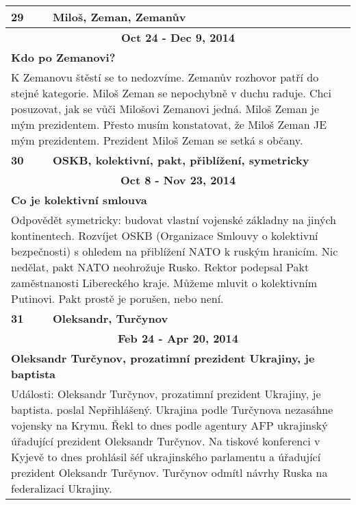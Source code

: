 \begin{tabularx}{\linewidth}{l l}
            \bf 29 & \bf Miloš, Zeman, Zemanův \\ \midrule
            
                \multicolumn{2}{c}{\bf Oct 24 - Dec 9, 2014} \\
                \multicolumn{2}{p{\linewidth}}{\bf Kdo po Zemanovi?} \\
                \multicolumn{2}{p{\linewidth}}{K Zemanovu štěstí se to nedozvíme. Zemanův rozhovor patří do stejné kategorie. Miloš Zeman se nepochybně v duchu raduje. Chci posuzovat, jak se vůči Milošovi Zemanovi jedná. Miloš Zeman je mým prezidentem. Přesto musím konstatovat, že Miloš Zeman JE mým prezidentem. Prezident Miloš Zeman se setká s občany.} \\ \midrule
                [1.5pt]

            \bf 30 & \bf OSKB, kolektivní, pakt, přiblížení, symetricky \\ \midrule
            
                \multicolumn{2}{c}{\bf Oct 8 - Nov 23, 2014} \\
                \multicolumn{2}{p{\linewidth}}{\bf Co je kolektivní smlouva} \\
                \multicolumn{2}{p{\linewidth}}{Odpovědět symetricky: budovat vlastní vojenské základny na jiných kontinentech. Rozvíjet OSKB (Organizace Smlouvy o kolektivní bezpečnosti) s ohledem na přiblížení NATO k ruským hranicím. Nic nedělat, pakt NATO neohrožuje Rusko. Rektor podepsal Pakt zaměstnanosti Libereckého kraje. Můžeme mluvit o kolektivním Putinovi. Pakt prostě je porušen, nebo není.} \\ \midrule
                [1.5pt]

            \bf 31 & \bf Oleksandr, Turčynov \\ \midrule
            
                \multicolumn{2}{c}{\bf Feb 24 - Apr 20, 2014} \\
                \multicolumn{2}{p{\linewidth}}{\bf Oleksandr Turčynov, prozatimní prezident Ukrajiny, je baptista} \\
                \multicolumn{2}{p{\linewidth}}{Události: Oleksandr Turčynov, prozatimní prezident Ukrajiny, je baptista. poslal Nepřihlášený. Ukrajina podle Turčynova nezasáhne vojensky na Krymu. Řekl to dnes podle agentury AFP ukrajinský úřadující prezident Oleksandr Turčynov. Na tiskové konferenci v Kyjevě to dnes prohlásil šéf ukrajinského parlamentu a úřadující prezident Oleksandr Turčynov. Turčynov odmítl návrhy Ruska na federalizaci Ukrajiny.} \\ \midrule
                [1.5pt]


\end{tabularx}

